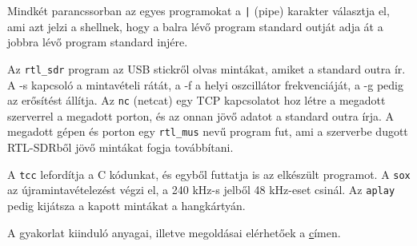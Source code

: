 \documentclass[12pt,a4paper]{article}
\begin{document}
Mindkét parancssorban az egyes programokat a \texttt{|} (pipe) karakter választja el, ami azt jelzi a shellnek,
hogy a balra lévő program standard outját adja át a jobbra lévő program standard injére.

Az \texttt{rtl\_sdr} program az USB stickről olvas mintákat, amiket a standard outra ír. A -s kapcsoló a mintavételi rátát, a -f a helyi oszcillátor frekvenciáját, a -g pedig az erősítést állítja.
Az \texttt{nc} (netcat) egy TCP kapcsolatot hoz létre a megadott szerverrel a megadott porton, és az onnan jövő adatot a standard outra írja.
A megadott gépen és porton egy \texttt{rtl\_mus} nevű program fut, ami a szerverbe dugott RTL-SDRből jövő mintákat fogja továbbítani.

A \texttt{tcc} lefordítja a C kódunkat, és egyből futtatja is az elkészült programot.
A \texttt{sox} az újramintavételezést végzi el, a 240 kHz-s jelből 48 kHz-eset csinál.
Az \texttt{aplay} pedig kijátsza a kapott mintákat a hangkártyán.

A gyakorlat kiinduló anyagai, illetve megoldásai elérhetőek a \href{https://github.com/simonyiszk/ha5kfu-SDR-gyak} címen.
\end{document}

